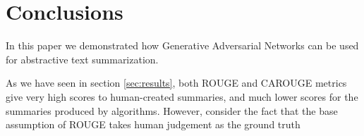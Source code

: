 \documentclass[sigplan]{acmart}
\begin{document}
\section*{Conclusions}

In this paper we demonstrated how Generative Adversarial Networks can be used for abstractive text summarization.

As we have seen in section \ref{sec:results}, both ROUGE and CAROUGE metrics give very high scores to human-created summaries, and much lower scores for the summaries produced by algorithms. However, consider the fact that the base assumption of ROUGE takes human judgement as the ground truth





\end{document}
